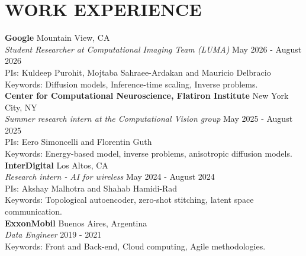 \documentclass[a4paper,9pt]{extarticle}
\begin{document}
\section*{WORK EXPERIENCE}


\noindent
\textbf{Google} \hfill Mountain View, CA\\ %
\textit{Student Researcher at Computational Imaging Team (LUMA)} \hfill May 2026 - August 2026\\ 
PIs: Kuldeep Purohit, Mojtaba Sahraee-Ardakan and Mauricio Delbracio\\ %
Keywords: Diffusion models, Inference-time scaling, Inverse problems.\\

\noindent
\textbf{Center for Computational Neuroscience, Flatiron Institute} \hfill New York City, NY\\ %
\textit{Summer research intern at the Computational Vision group} \hfill May 2025 - August 2025\\ 
PIs: Eero Simoncelli and Florentin Guth\\ %
Keywords: Energy-based model, inverse problems, anisotropic diffusion models.\\

\noindent
\textbf{InterDigital} \hfill Los Altos, CA\\ %
\textit{Research intern - AI for wireless} \hfill May 2024 - August 2024\\ %
PIs: Akshay Malhotra and Shahab Hamidi-Rad\\
Keywords: Topological autoencoder, zero-shot stitching, latent space communication.\\

\noindent
\textbf{ExxonMobil} \hfill Buenos Aires, Argentina\\ %
\textit{Data Engineer} \hfill 2019 - 2021\\ %
Keywords: Front and Back-end, Cloud computing, Agile methodologies.\\
\end{document}
